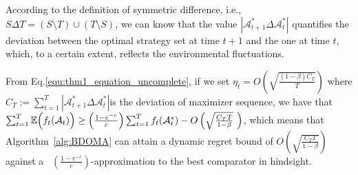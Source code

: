 \begin{remark} According to the definition of symmetric difference, i.e., $S\Delta T=(S\setminus T)\cup(T\setminus S)$, we can know that the value  $|\mathcal{A}_{t+1}^{*}\Delta\mathcal{A}_{t}^{*}|$  quantifies the deviation between the optimal strategy set at time $t+1$ and the one at time $t$, which, to a certain extent, reflects the environmental fluctuations.
\end{remark}
\begin{remark}\label{Remark:final}
	From Eq.\eqref{equ:thm1_equation_uncomplete}, if we set $\eta_{t}=O\left(\sqrt{\frac{(1-\beta)C_{T}}{T}}\right)$ where $C_{T}:=\sum_{t=1}^{T}|\mathcal{A}_{t+1}^{*}\Delta\mathcal{A}_{t}^{*}|$is the deviation of maximizer sequence, we have that $\sum_{t=1}^{T}\E\Big(f_{t}(\mathcal{A}_{t})\Big)\ge\Big(\frac{1-e^{-c}}{c}\Big)\sum_{t=1}^{T}f_{t}(\mathcal{A}_{t}^{*})-O\left(\sqrt{\frac{C_{T}T}{1-\beta}}\ \right)$, which means that Algorithm~\ref{alg:BDOMA} can attain a dynamic regret bound of $O(\sqrt{\frac{C_{T}T}{1-\beta}})$ against a  $(\frac{1-e^{-c}}{c})$-approximation to the best comparator in hindsight. %
\end{remark}